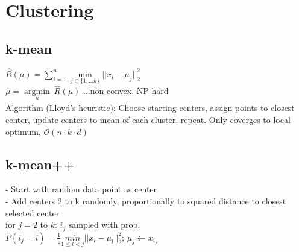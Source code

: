 \section*{Clustering}
\subsection*{k-mean}

$\hat{R}(\mu) = \sum_{i=1}^n \underset{j\in\{1,...k\}}{\operatorname{min}}||x_i-\mu_j||_2^2$\\
$\hat{\mu} =  \underset{\mu}{\operatorname{argmin}} ~ \hat{R}(\mu)$ ...non-convex, NP-hard \\
Algorithm (Lloyd's heuristic): Choose starting centers, assign points to closest center, update centers to mean of each cluster, repeat. Only coverges to local optimum, $\mathcal{O}(n\cdot k\cdot d)$

\subsection*{k-mean++}
- Start with random data point as center\\
- Add centers 2 to k randomly, proportionally to squared distance to closest selected center\\
for $j=2$ to $k$:
$i_j$ sampled with prob.\\
$P(i_j=i) = \frac{1}{z} \underset{1\leq l<j}{min}||x_i-\mu_l||_2^2$; $\mu_j \leftarrow x_{i_j}$